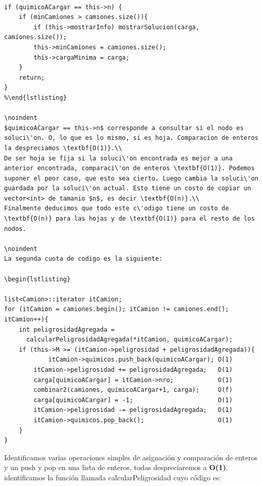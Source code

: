 \begin{lstlisting}

if (quimicoACargar == this->n) {
	if (minCamiones > camiones.size()){                                 
		if (this->mostrarInfo) mostrarSolucion(carga, camiones.size());
		this->minCamiones = camiones.size();
		this->cargaMinima = carga;
	}
	return;
}
%\end{lstlisting}

\noindent 
$quimicoACargar == this->n$ corresponde a consultar si el nodo es soluci\'on. O, lo que es lo mismo, si es hoja. Comparacion de enteros la despreciamos \textbf{O(1)}.\\
De ser hoja se fija si la soluci\'on encontrada es mejor a una anterior encontrada, comparaci\'on de enteros \textbf{O(1)}. Podemos suponer el peor caso, que esto sea cierto. Luego cambia la soluci\'on guardada por la soluci\'on actual. Esto tiene un costo de copiar un vector<int> de tamanio $n$, es decir \textbf{O(n)}.\\
Finalmente deducimos que todo este c\'odigo tiene un costo de \textbf{O(n)} para las hojas y de \textbf{O(1)} para el resto de los nodos.

\noindent 
La segunda cuota de codigo es la siguiente:

\begin{lstlisting}

list<Camion>::iterator itCamion;
for (itCamion = camiones.begin(); itCamion != camiones.end(); itCamion++){
	int peligrosidadAgregada = 
      calcularPeligrosidadAgregada(*itCamion, quimicoACargar);    
	if (this->M >= (itCamion->peligrosidad + peligrosidadAgregada)){                  
			itCamion->quimicos.push_back(quimicoACargar); O(1)
		itCamion->peligrosidad += peligrosidadAgregada;   O(1)
		carga[quimicoACargar] = itCamion->nro;            O(1)
		combinar2(camiones, quimicoACargar+1, carga);     O(f)
		carga[quimicoACargar] = -1;                       O(1)
		itCamion->peligrosidad -= peligrosidadAgregada;   O(1)
		itCamion->quimicos.pop_back();                    O(1)
	}
}
\end{lstlisting}

\noindent 
Identificamos varias operaciones simples de asignaci\'on y comparaci\'on de enteros y un push y pop en una lista de enteros, todas despreciaremos a \textbf{O(1)}. \\
identificamos la funci\'on llamada calcularPeligrosidad cuyo c\'odigo es:

